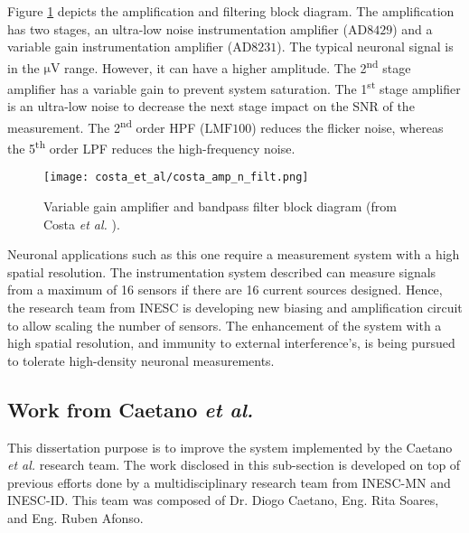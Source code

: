 Figure \ref{figure:costa-amp} depicts the amplification and filtering block diagram. The amplification has two stages, an ultra-low noise instrumentation amplifier ($\mathrm{AD8429}$) and a variable gain instrumentation amplifier ($\mathrm{AD8231}$). The typical neuronal signal is in the $\mathrm{\mu V}$ range. However, it can have a higher amplitude. The 2\textsuperscript{nd} stage amplifier has a variable gain to prevent system saturation. The 1\textsuperscript{st} stage amplifier is an ultra-low noise to decrease the next stage impact on the \ac{SNR} of the measurement. The 2\textsuperscript{nd} order \ac{HPF} ($\mathrm{LMF100}$) reduces the flicker noise, whereas the 5\textsuperscript{th} order \ac{LPF} reduces the high-frequency noise.

\begin{figure}[!ht]
    \centering
    \texttt{[image: costa\_et\_al/costa\_amp\_n\_filt.png]}
    \caption{Variable gain amplifier and bandpass filter block diagram (from Costa \textit{et al.} \cite{TIM.2013.2296417}).}
    \label{figure:costa-amp}
\end{figure}

Neuronal applications such as this one require a measurement system with a high spatial resolution. The instrumentation system described can measure signals from a maximum of 16 sensors if there are 16 current sources designed. Hence, the research team from \ac{INESC} is developing new biasing and amplification circuit to allow scaling the number of sensors. The enhancement of the system with a high spatial resolution, and immunity to external interference's, is being pursued to tolerate high-density neuronal measurements.

\subsection{Work from Caetano \textit{et al.}}

This dissertation purpose is to improve the system implemented by the Caetano \textit{et al.} research team. The work disclosed in this sub-section is developed on top of previous efforts done by a multidisciplinary research team from \ac{INESC-MN} and \ac{INESC-ID}. This team was composed of Dr. Diogo Caetano, Eng. Rita Soares, and Eng. Ruben Afonso.

